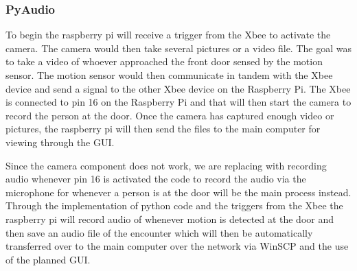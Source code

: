 \subsubsection{PyAudio}
\par To begin the raspberry pi will receive a trigger from the Xbee to activate the camera. The camera would then take several pictures or a video file. The goal was to take a video of whoever approached the front door sensed by the motion sensor. The motion sensor would then communicate in tandem with the Xbee device and send a signal to the other Xbee device on the Raspberry Pi. The Xbee is connected to pin 16 on the Raspberry Pi and that will then start the camera to record the person at the door. Once the camera has captured enough video or pictures, the raspberry pi will then send the files to the main computer for viewing through the GUI. 
\par Since the camera component does not work, we are replacing with recording audio whenever pin 16 is activated the code to record the audio via the microphone for whenever a person is at the door will be the main process instead. Through the implementation of python code and the triggers from the Xbee the raspberry pi will record audio of whenever motion is detected at the door and then save an audio file of the encounter which will then be automatically transferred over to the main computer over the network via WinSCP and the use of the planned GUI.


